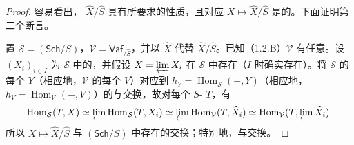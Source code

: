 \begin{proof}
容易看出， $\widehat X/\widehat S$ 具有所要求的性质，且对应 $X\mapsto\widehat X/\widehat S$ 是的。下面证明第二个断言。

置 $\mathcal S=(\mathsf{Sch}/S)$，$\mathcal V=\mathsf{Vaf}_{/\widehat S}$，并以 $\widehat X$ 代替 $\widehat X/\widehat S$。已知（1.2.B）$\mathcal V$ 有任意。设 $(X_i)_{i\in I}$ 为 $\mathcal S$ 中的，并假设 $X=\varprojlim X_i$ 在 $\mathcal S$ 中存在（$I$ 时确实存在）。将 $\mathcal S$ 的每个 $Y$（相应地，$\mathcal V$ 的每个 $V$）对应到 $h_Y=\operatorname{Hom}_{\mathcal S}(-,Y)$（相应地，$h_V=\operatorname{Hom}_{\mathcal V}(-,V)$）的与交换，故对每个 $S$- $T$，有
\[
 \operatorname{Hom}_{\mathcal S}(T,X)\simeq\varprojlim\operatorname{Hom}_{\mathcal S}(T,X_i)
 \simeq\varprojlim\operatorname{Hom}_{\mathcal V}(T,\widehat X_i)
 \simeq\operatorname{Hom}_{\mathcal V}(T,\varprojlim\widehat X_i).
\]
所以 $X\mapsto\widehat X/\widehat S$ 与 $(\mathsf{Sch}/S)$ 中存在的交换；特别地，与交换。
\end{proof}

